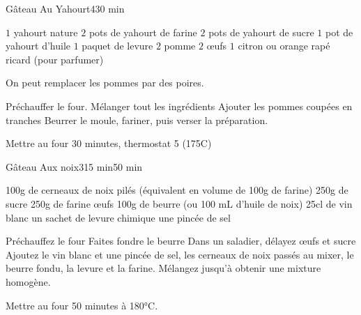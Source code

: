 \begin{recette}{Gâteau Au Yahourt}{4}{}{30 min}

\begin{ingredients}
\ingredient $1$ yahourt nature
\ingredient $2$ pots de yahourt de farine
\ingredient $2$ pots de yahourt de sucre
\ingredient $1$ pot de yahourt d'huile
\ingredient $1$ paquet de levure
\ingredient $2$ pomme
\ingredient $2$ œufs
\ingredient $1$ citron ou orange rapé
\ingredient ricard (pour parfumer)
\end{ingredients}

\begin{remarque}
On peut remplacer les pommes par des poires.
\end{remarque}

\begin{preparation}
\etape Préchauffer le four.
\etape Mélanger tout les ingrédients
\etape Ajouter les pommes coupées en tranches
\etape Beurrer le moule, fariner, puis verser la préparation.
\end{preparation}

\begin{cuisson}
Mettre au four 30 minutes, thermostat 5 (175\degres C)
\end{cuisson}
\end{recette}

\begin{recette}{Gâteau Aux noix}{3}{15 min}{50 min}

\begin{ingredients}
\ingredient 100g de cerneaux de noix pilés (équivalent en volume de 100g de farine)
\ingredient 250g de sucre
\ingredient 250g de farine
 œufs
\ingredient 100g de beurre (ou 100 mL d'huile de noix)
\ingredient 25cl de vin blanc
\ingredient un sachet de levure chimique
\ingredient une pincée de sel
\end{ingredients}

\begin{preparation}
\etape Préchauffez le four
\etape Faites fondre le beurre
\etape Dans un saladier, délayez œufs et sucre
\etape Ajoutez le vin blanc et une pincée de sel, les cerneaux de noix passés au mixer, le beurre fondu, la levure et la farine. 
\etape Mélangez jusqu'à obtenir une mixture homogène. 
\end{preparation}

\begin{cuisson}
Mettre au four 50 minutes à 180°C.
\end{cuisson}
\end{recette}

